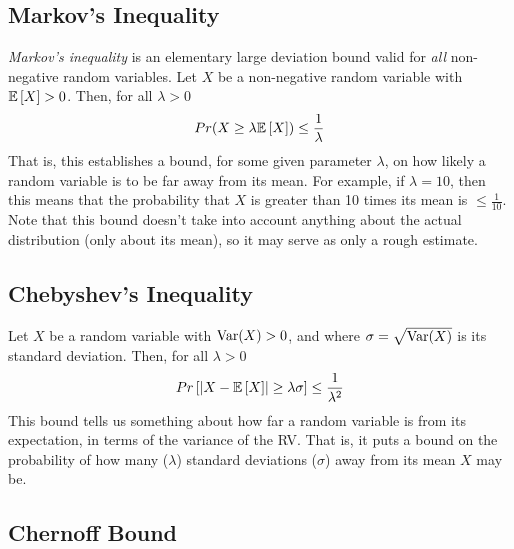 \documentclass[10pt,a4paper]{article}
\begin{document}
\subsection*{Markov's Inequality}

\textit{Markov's inequality} is an elementary large deviation bound valid for \textit{all} non-negative random variables. Let $X$ be a non-negative random variable with $\mathbb{E}\left[X\right] > 0$. Then, for all $\lambda > 0$
\begin{align*}
    Pr(X \geq \lambda \mathbb{E}\left[X\right]) \leq \dfrac{1}{\lambda}
\end{align*}
That is, this establishes a bound, for some given parameter $\lambda$, on how likely a random variable is to be far away from its mean. For example, if $\lambda = 10$, then this means that the probability that $X$ is greater than 10 times its mean is $\leq \frac{1}{10}$. Note that this bound doesn't take into account anything about the actual distribution (only about its mean), so it may serve as only a rough estimate.

\subsection*{Chebyshev's Inequality}

Let $X$ be a random variable with $\text{Var}(X) > 0$, and where $\sigma = \sqrt{\text{Var}(X)}$ is its standard deviation. Then, for all $\lambda > 0$
\begin{align*}
    Pr \left[ \left| X - \mathbb{E}\left[X\right] \right| \geq \lambda \sigma \right] \leq \dfrac{1}{\lambda^2}
\end{align*}
This bound tells us something about how far a random variable is from its expectation, in terms of the variance of the RV. That is, it puts a bound on the probability of how many ($\lambda$) standard deviations ($\sigma$) away from its mean $X$ may be.


\subsection*{Chernoff Bound}
\end{document}
